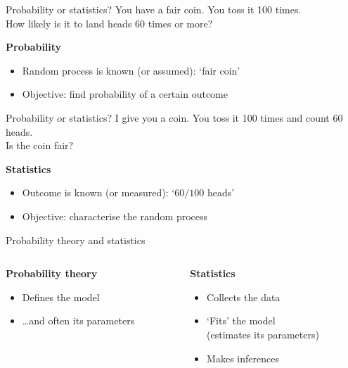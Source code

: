 \begin{frame}[t]{Probability or statistics?}
    You have a fair coin. You toss it 100 times. \\
    How likely is it to land heads 60 times or more?
    \vfill\pause
    \begin{center}
        \large%
        \textbf{Probability}
    \end{center}
    \begin{itemize}
        \item Random process is known (or assumed): `fair coin'
        \item Objective: \alert{find probability of a certain outcome}
    \end{itemize}
\end{frame}

\begin{frame}[t]{Probability or statistics?}
    I give you a coin. You toss it 100 times and count 60 heads. \\
    Is the coin fair?
    \vfill\pause
    \begin{center}
        \large%
        \textbf{Statistics}
    \end{center}
    \begin{itemize}
        \item Outcome is known (or measured): `$60 / 100$ heads'
        \item Objective: \alert{characterise the random process}
    \end{itemize}
\end{frame}

\begin{frame}{Probability theory and statistics}
    \begin{columns}[t]
        \begin{column}{0.5\textwidth}
            \begin{center}
                \textbf{Probability theory}
            \end{center}
            \begin{itemize}
                \item Defines the model
                \item \ldots and often its \alert{parameters}
            \end{itemize}
        \end{column}
        \begin{column}{0.5\textwidth}
            \begin{center}
                \textbf{Statistics}
            \end{center}
            \begin{itemize}
                \item Collects the data
                \item `Fits' the model \\ (estimates its parameters)
                \item Makes \alert{inferences}
            \end{itemize}
        \end{column}
    \end{columns}
\end{frame}



